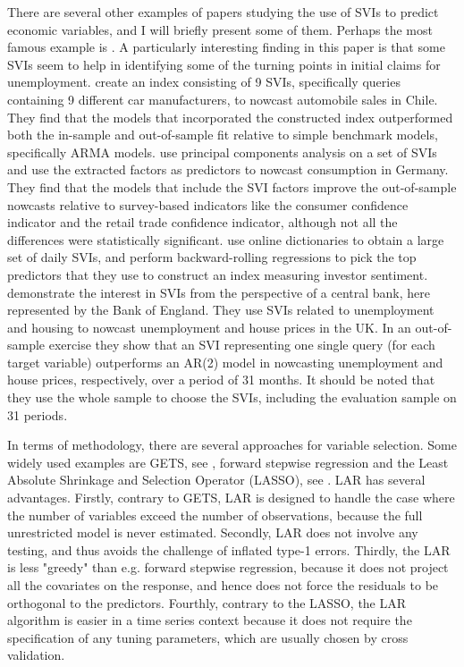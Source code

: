 There are several other examples of papers studying the use of SVIs to predict economic variables, and I will briefly present some of them. Perhaps the most famous example is \textcite{choi2012}. A particularly interesting finding in this paper is that some SVIs seem to help in identifying some of the turning points in initial claims for unemployment. \textcite{carriere2013} create an index consisting of 9 SVIs, specifically queries containing 9 different car manufacturers, to nowcast automobile sales in Chile. They find that the models that incorporated the constructed index outperformed both the in-sample and out-of-sample fit relative to simple benchmark models, specifically ARMA models. \textcite{vosen2012} use principal components analysis on a set of SVIs and use the extracted factors as predictors to nowcast consumption in Germany. They find that the models that include the SVI factors improve the out-of-sample nowcasts relative to survey-based indicators like the consumer confidence indicator and the retail trade confidence indicator, although not all the differences were statistically significant. \textcite{da2015} use online dictionaries to obtain a large set of daily SVIs, and perform backward-rolling regressions to pick the top predictors that they use to construct an index measuring investor sentiment. \textcite{boe2011} demonstrate the interest in SVIs from the perspective of a central bank, here represented by the Bank of England. They use SVIs related to unemployment and housing to nowcast unemployment and house prices in the UK. In an out-of-sample exercise they show that an SVI representing one single query (for each target variable) outperforms an AR(2) model in nowcasting unemployment and house prices, respectively, over a period of 31 months. It should be noted that they use the whole sample to choose the SVIs, including the evaluation sample on 31 periods.

In terms of methodology, there are several approaches for variable selection. Some widely used examples are GETS, see \textcite{campos2003}, forward stepwise regression and the Least Absolute Shrinkage and Selection Operator (LASSO), see \textcite{tibshirani1996}. LAR has several advantages. Firstly, contrary to GETS, LAR is designed to handle the case where the number of variables exceed the number of observations, because the full unrestricted model is never estimated. Secondly, LAR does not involve any testing, and thus avoids the challenge of inflated type-1 errors. Thirdly, the LAR is less "greedy" than e.g. forward stepwise regression, because it does not project all the covariates on the response, and hence does not force the residuals to be orthogonal to the predictors. Fourthly, contrary to the LASSO, the LAR algorithm is easier in a time series context because it does not require the specification of any tuning parameters, which are usually chosen by cross validation.